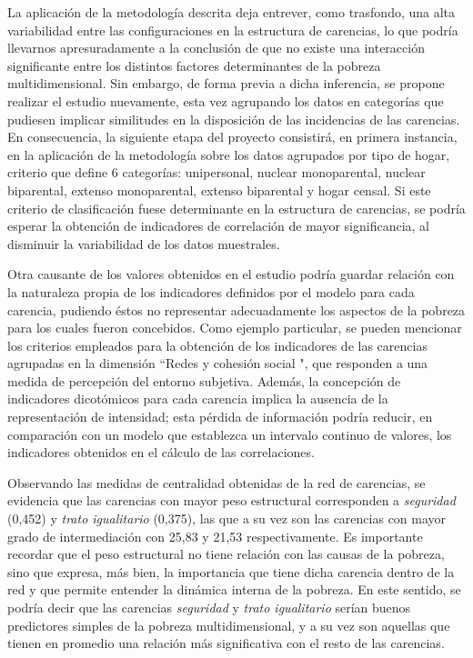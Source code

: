 La aplicación de la metodología descrita deja entrever, como trasfondo, una alta variabilidad entre las configuraciones en la estructura de carencias, lo que podría llevarnos apresuradamente a la conclusión de que no existe una interacción significante entre los distintos factores determinantes de la pobreza multidimensional. Sin embargo, de forma previa a dicha inferencia, se propone realizar el estudio nuevamente, esta vez agrupando los datos en categorías que pudiesen implicar similitudes en la disposición de las incidencias de las carencias. En consecuencia, la siguiente etapa del proyecto consistirá, en primera instancia, en la aplicación de la metodología sobre los datos agrupados por tipo de hogar, criterio que define 6 categorías: unipersonal, nuclear monoparental, nuclear biparental, extenso monoparental, extenso biparental y hogar censal. Si este criterio de clasificación fuese determinante en la estructura de carencias, se podría esperar la obtención de indicadores de correlación de mayor significancia, al disminuir la variabilidad de los datos muestrales. 

Otra causante de los valores obtenidos en el estudio podría guardar relación con la naturaleza propia de los indicadores definidos por el modelo para cada carencia, pudiendo éstos no representar adecuadamente los aspectos de la pobreza para los cuales fueron concebidos. Como ejemplo particular, se pueden mencionar los criterios empleados para la obtención de los indicadores de las carencias agrupadas en la dimensión ``Redes y cohesión social ", que responden a una medida de percepción del entorno subjetiva. Además, la concepción de indicadores dicotómicos para cada carencia implica la ausencia de la representación de intensidad; esta pérdida de información podría reducir, en comparación con un modelo que establezca un intervalo continuo de valores, los indicadores obtenidos en el cálculo de las correlaciones. 


Observando las medidas de centralidad obtenidas de la red de carencias, se evidencia que las carencias con mayor peso estructural corresponden a \textit{seguridad} (0,452) y \textit{trato igualitario} (0,375), las que a su vez son las carencias con mayor grado de intermediación con 25,83 y 21,53 respectivamente. Es importante recordar que el peso estructural no tiene relación con las causas de la pobreza, sino que expresa, más bien, la importancia que tiene dicha carencia dentro de la red y que permite entender la dinámica interna de la pobreza. En este sentido, se podría decir que las carencias \textit{seguridad} y \textit{trato igualitario} serían buenos predictores simples de la pobreza multidimensional, y a su vez son aquellas que tienen en promedio una relación más significativa con el resto de las carencias. 

